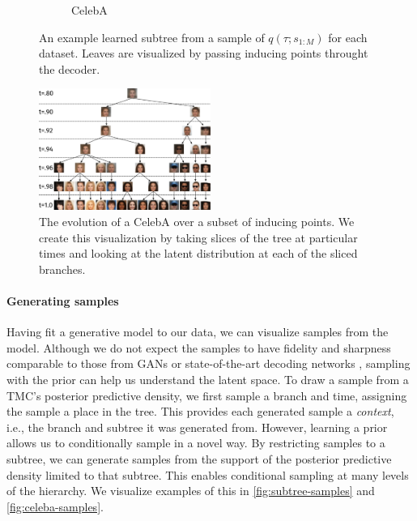 \begin{figure}[t]
\begin{subfigure}[t]{0.2\textwidth}
\caption{CelebA}
\end{subfigure}
\caption{An example learned subtree from a sample of $q(\tau; s_{1:M})$ for each dataset. 
Leaves are visualized by passing inducing points throught the decoder.}
\label{fig:subtrees}
\end{figure}

\begin{figure}[t]
\centering
\includegraphics[width=0.5\textwidth]{img/loracs/celeba/celeba-evolution.png}
\caption{The evolution of a CelebA over a subset of inducing points. We create
this visualization by taking slices of the tree at particular times
and looking at the latent distribution 
at each of the sliced branches.}
\label{fig:celeba-evolution}
\end{figure}

\paragraph{Generating samples} 
Having fit a generative model to our data,
we can visualize samples from the model.
Although we do not expect the samples
to have fidelity and sharpness comparable
to those from GANs or state-of-the-art
decoding networks \citep{radford2015unsupervised, salimans2017pixelcnn++},
sampling with the
\acronym\;prior can help us understand the latent space.
To draw a sample from a TMC's posterior predictive density,
we first sample a branch and time, assigning
the sample a place in the tree.
This provides each generated sample a \emph{context},
i.e., the branch and subtree it was generated from.
However, learning a \acronym\;prior allows us to
conditionally sample in a novel way. By restricting
samples to a subtree, we can generate samples
from the support of the posterior predictive density
limited to that subtree. This enables
conditional sampling at many levels of
the hierarchy. We visualize examples
of this in \autoref{fig:subtree-samples}
and \autoref{fig:celeba-samples}.

